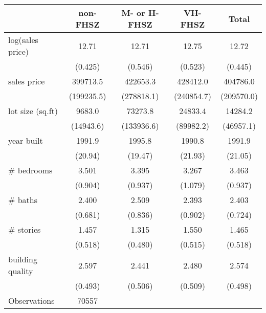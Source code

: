 \begin{tabular}{l*{4}{c}}
\hline\hline
                    &    non-FHSZ&M- or H-FHSZ&     VH-FHSZ&       Total\\
\hline
log(sales price)    &       12.71&       12.71&       12.75&       12.72\\
                    &     (0.425)&     (0.546)&     (0.523)&     (0.445)\\
[1em]
sales price         &    399713.5&    422653.3&    428412.0&    404786.0\\
                    &  (199235.5)&  (278818.1)&  (240854.7)&  (209570.0)\\
[1em]
lot size (sq.ft)    &      9683.0&     73273.8&     24833.4&     14284.2\\
                    &   (14943.6)&  (133936.6)&   (89982.2)&   (46957.1)\\
[1em]
year built          &      1991.9&      1995.8&      1990.8&      1991.9\\
                    &     (20.94)&     (19.47)&     (21.93)&     (21.05)\\
[1em]
\# bedrooms         &       3.501&       3.395&       3.267&       3.463\\
                    &     (0.904)&     (0.937)&     (1.079)&     (0.937)\\
[1em]
\# baths            &       2.400&       2.509&       2.393&       2.403\\
                    &     (0.681)&     (0.836)&     (0.902)&     (0.724)\\
[1em]
\# stories          &       1.457&       1.315&       1.550&       1.465\\
                    &     (0.518)&     (0.480)&     (0.515)&     (0.518)\\
[1em]
building quality    &       2.597&       2.441&       2.480&       2.574\\
                    &     (0.493)&     (0.506)&     (0.509)&     (0.498)\\
\hline
Observations        &       70557&            &            &            \\
\hline\hline
\end{tabular}
